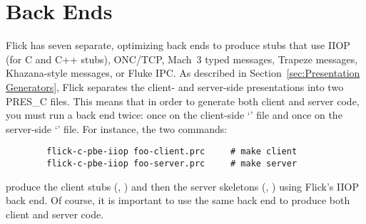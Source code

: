 

\section{Back Ends}
\label{sec:Back Ends}

Flick has seven separate, optimizing back ends to produce stubs that use IIOP
(for C and C++ stubs), ONC/TCP, Mach~3 typed messages, Trapeze messages,
Khazana-style messages, or Fluke IPC\@.  As described in
Section~\ref{sec:Presentation Generators}, Flick separates the client- and
server-side presentations into two PRES\_C files.  This means that in order to
generate both client and server code, you must run a back end twice: once on
the client-side `' file and once on the server-side
`' file.  For instance, the two commands:

\begin{verbatim}
        flick-c-pbe-iiop foo-client.prc     # make client
        flick-c-pbe-iiop foo-server.prc     # make server
\end{verbatim}

\noindent produce the client stubs (,
) and then the server skeletons
(, ) using Flick's IIOP back end.
Of course, it is important to use the same back end to produce both client and
server code.




